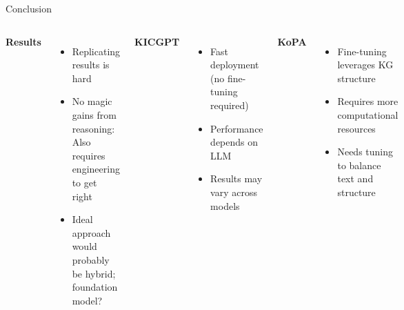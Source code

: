 \documentclass[aspectratio=169,xcolor=dvipsnames]{beamer}
\begin{document}


\begin{frame}{Conclusion}

    \begin{columns}[t]
        \textbf{Results}
        \begin{itemize}
            \item Replicating results is hard
            \item No magic gains from reasoning:
            Also requires engineering to get right
            \item Ideal approach would probably be hybrid; foundation model?
        \end{itemize}

        \textbf{KICGPT}
        \begin{itemize}
            \item Fast deployment (no fine-tuning required)
            \item Performance depends on LLM
            \item Results may vary across models
        \end{itemize}
        \textbf{KoPA}
        \begin{itemize}
            \item Fine-tuning leverages KG structure
            \item Requires more computational resources
            \item Needs tuning to balance text and structure
        \end{itemize}
    \end{columns}
    \vspace{4mm}
    \begin{center}
    \end{center}
\end{frame}
\end{document}
